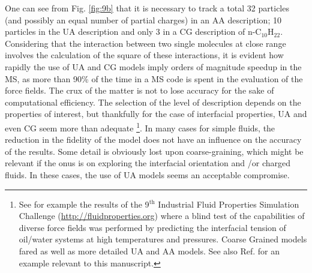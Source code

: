 \documentclass[9pt,tutorial]{livecoms}
\begin{document}
One can see from Fig. \ref{fig:9b} that it is necessary to track a total 32 particles (and possibly
an equal number of partial charges) in an AA description; 10 particles in the
UA description and only 3 in a CG description of n-C$_{10}$H$_{22}$.
Considering that the interaction between two single molecules at close range
involves the calculation of the square of these interactions, it is evident how
rapidly the use of UA and CG models imply orders of magnitude speedup in
the MS, as more than 90\% of the time in a MS code is spent in the evaluation
of the force fields. The crux of the matter is not to lose accuracy for the
sake of computational efficiency. The selection of the level of description
depends on the properties of interest, but thankfully for the case of
interfacial properties, UA and even CG seem more than adequate
\footnote{See for example the results of the 9$^{\mathrm{th}}$
Industrial Fluid Properties Simulation Challenge
(\url{http://fluidproperties.org}) where a blind test of the capabilities of
diverse force fields was performed by predicting the interfacial tension of
oil/water systems at high temperatures and pressures. Coarse Grained models
\citep{herdes2018} fared as well as more detailed UA and AA models\citep{chen2018}.
See also Ref. \citep{avendano2011} for an example relevant to this manuscript.}.
In many cases for
simple fluids, the reduction in the fidelity of the model does not have an
influence on the accuracy of the results. 
Some detail is obviously lost upon coarse-graining,
which might be relevant if the onus is on exploring the interfacial orientation
and /or charged fluids. In these cases, the use of UA models seems an
acceptable compromise. 
\end{document}
